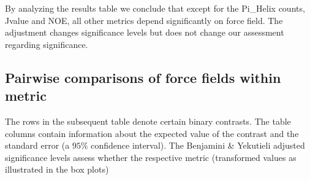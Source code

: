 \documentclass{article}\usepackage[table]{xcolor}
\renewcommand{\$}{$} %
\begin{document}
By analyzing the results table we conclude that except for the
Pi\_Helix counts, Jvalue and NOE, all other metrics depend
significantly on force field. The adjustment changes significance
levels but does not change our assessment regarding significance.
\subsection{Pairwise comparisons of force fields within metric}



The rows in the subsequent table denote certain binary contrasts. The
table columns contain information about the expected value of the
contrast and the standard error (a $95\%$ confidence interval).  The
Benjamini \& Yekutieli adjusted significance levels assess whether the 
respective metric (transformed values as illustrated in the box plots)
\end{document}

